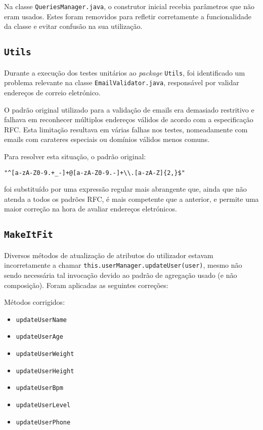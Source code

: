 \documentclass[12pt, a4paper]{article}
\begin{document}
Na classe \texttt{QueriesManager.java}, o construtor inicial recebia parâmetros
que não eram usados. Estes foram removidos para refletir corretamente a
funcionalidade da classe e evitar confusão na sua utilização.

\subsection{\texttt{Utils}}

Durante a execução dos testes unitários ao \emph{package} \texttt{Utils}, foi
identificado um problema relevante na classe \texttt{EmailValidator.java},
responsável por validar endereços de correio eletrónico.

O padrão original utilizado para a validação de emails era demasiado restritivo
e falhava em reconhecer múltiplos endereços válidos de acordo com a
especificação RFC. Esta limitação resultava em várias falhas nos testes,
nomeadamente com emails com carateres especiais ou domínios válidos menos comuns.

Para resolver esta situação, o padrão original:
\begin{verbatim}
"^[a-zA-Z0-9.+_-]+@[a-zA-Z0-9.-]+\\.[a-zA-Z]{2,}$"
\end{verbatim}
foi substituído por uma expressão regular mais abrangente que, ainda que não
atenda a todos os padrões RFC, é mais competente que a anterior, e permite
uma maior correção na hora de avaliar endereços eletrónicos.
\subsection{\texttt{MakeItFit}}

Diversos métodos de atualização de atributos do utilizador estavam incorretamente a chamar
\texttt{this.userManager.updateUser(user)}, mesmo não sendo necessária tal invocação devido ao
padrão de agregação usado (e não composição). Foram aplicadas as seguintes correções:

Métodos corrigidos:
\begin{itemize}
    \item \texttt{updateUserName}
    \item \texttt{updateUserAge}
    \item \texttt{updateUserWeight}
    \item \texttt{updateUserHeight}
    \item \texttt{updateUserBpm}
    \item \texttt{updateUserLevel}
    \item \texttt{updateUserPhone}
\end{itemize}
\end{document}
